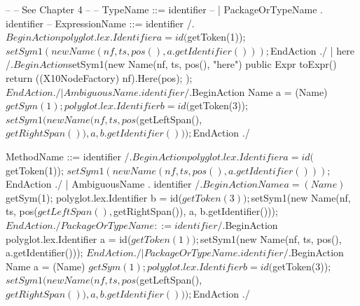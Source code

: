     --
    -- See Chapter 4
    --
    -- TypeName ::= identifier
    --           | PackageOrTypeName . identifier
    --
    ExpressionName ::= identifier
        /.$BeginAction
                    polyglot.lex.Identifier a = id($getToken(1));
                    $setSym1(new Name(nf, ts, pos(), a.getIdentifier()));
          $EndAction
        ./
                     | here 
        /.$BeginAction
                    $setSym1(new Name(nf, ts, pos(), "here"){
                                public Expr toExpr() {
                                  return ((X10NodeFactory) nf).Here(pos);
                                }
                             });
          $EndAction
        ./
                     | AmbiguousName . identifier
        /.$BeginAction
                    Name a = (Name) $getSym(1);
                    polyglot.lex.Identifier b = id($getToken(3));
                    $setSym1(new Name(nf,
                                      ts,
                                      pos($getLeftSpan(), $getRightSpan()),
                                      a,
                                      b.getIdentifier()));
          $EndAction
        ./

    MethodName ::= identifier
        /.$BeginAction
                    polyglot.lex.Identifier a = id($getToken(1));
                    $setSym1(new Name(nf, ts, pos(), a.getIdentifier()));
          $EndAction
        ./
                 | AmbiguousName . identifier
        /.$BeginAction
                    Name a = (Name) $getSym(1);
                    polyglot.lex.Identifier b = id($getToken(3));
                    $setSym1(new Name(nf,
                                      ts,
                                      pos($getLeftSpan(), $getRightSpan()),
                                      a,
                                      b.getIdentifier()));
          $EndAction
        ./

    PackageOrTypeName ::= identifier
        /.$BeginAction
                    polyglot.lex.Identifier a = id($getToken(1));
                    $setSym1(new Name(nf, ts, pos(), a.getIdentifier()));
          $EndAction
        ./
                        | PackageOrTypeName . identifier
        /.$BeginAction
                    Name a = (Name) $getSym(1);
                    polyglot.lex.Identifier b = id($getToken(3));
                    $setSym1(new Name(nf,
                                      ts,
                                      pos($getLeftSpan(), $getRightSpan()),
                                      a,
                                      b.getIdentifier()));
          $EndAction
        ./

